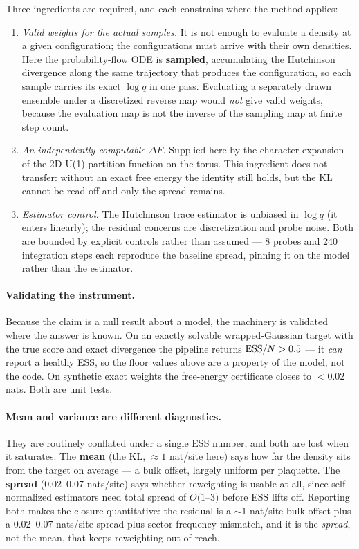 Three ingredients are required, and each constrains where the method applies:

\begin{enumerate}
  \item \emph{Valid weights for the actual samples.} It is not enough to
    evaluate a density at a given configuration; the configurations must
    arrive with their own densities. Here the probability-flow ODE is
    \textbf{sampled}, accumulating the Hutchinson divergence along the same
    trajectory that produces the configuration, so each sample carries its
    exact $\log q$ in one pass. Evaluating a separately drawn ensemble under
    a discretized reverse map would \emph{not} give valid weights, because
    the evaluation map is not the inverse of the sampling map at finite step
    count.
  \item \emph{An independently computable $\Delta F$.} Supplied here by the
    character expansion of the 2D U(1) partition function on the torus. This
    ingredient does not transfer: without an exact free energy the identity
    still holds, but the KL cannot be read off and only the spread remains.
  \item \emph{Estimator control.} The Hutchinson trace estimator is unbiased
    in $\log q$ (it enters linearly); the residual concerns are
    discretization and probe noise. Both are bounded by explicit controls
    rather than assumed --- 8 probes and 240 integration steps each reproduce
    the baseline spread, pinning it on the model rather than the estimator.
\end{enumerate}

\paragraph{Validating the instrument.} Because the claim is a null result
about a model, the machinery is validated where the answer is known. On an
exactly solvable wrapped-Gaussian target with the true score and exact
divergence the pipeline returns ${\rm ESS}/N > 0.5$ --- it \emph{can} report
a healthy ESS, so the floor values above are a property of the model, not the
code. On synthetic exact weights the free-energy certificate closes to
$< 0.02$ nats. Both are unit tests.

\paragraph{Mean and variance are different diagnostics.} They are routinely
conflated under a single ESS number, and both are lost when it saturates. The
\textbf{mean} (the KL, ${\approx}1$ nat/site here) says how far the density
sits from the target on average --- a bulk offset, largely uniform per
plaquette. The \textbf{spread} (0.02--0.07 nats/site) says whether
reweighting is usable at all, since self-normalized estimators need total
spread of $O(1$--$3)$ before ESS lifts off. Reporting both makes the closure
quantitative: the residual is a ${\sim}1$ nat/site bulk offset plus a
0.02--0.07 nats/site spread plus sector-frequency mismatch, and it is the
\emph{spread}, not the mean, that keeps reweighting out of reach.

